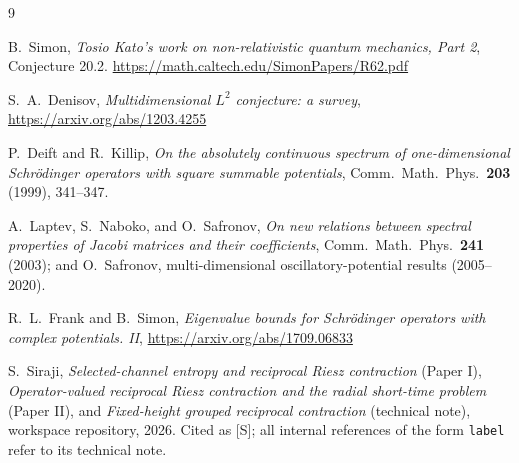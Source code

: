 \documentclass[11pt]{article}
\theoremstyle{remark}
\theoremstyle{definition}
\begin{document}
\begin{thebibliography}{9}

B.~Simon,
\emph{Tosio Kato's work on non-relativistic quantum mechanics, Part 2},
Conjecture 20.2.
\url{https://math.caltech.edu/SimonPapers/R62.pdf}

S.~A.~Denisov,
\emph{Multidimensional $L^2$ conjecture: a survey},
\url{https://arxiv.org/abs/1203.4255}

P.~Deift and R.~Killip,
\emph{On the absolutely continuous spectrum of one-dimensional Schr\"odinger
operators with square summable potentials},
Comm.~Math.~Phys.\ \textbf{203} (1999), 341--347.

A.~Laptev, S.~Naboko, and O.~Safronov,
\emph{On new relations between spectral properties of Jacobi matrices and
their coefficients},
Comm.~Math.~Phys.\ \textbf{241} (2003); and O.~Safronov, multi-dimensional
oscillatory-potential results (2005--2020).

R.~L.~Frank and B.~Simon,
\emph{Eigenvalue bounds for Schr\"odinger operators with complex potentials.
II},
\url{https://arxiv.org/abs/1709.06833}

S.~Siraji,
\emph{Selected-channel entropy and reciprocal Riesz contraction} (Paper I),
\emph{Operator-valued reciprocal Riesz contraction and the radial short-time
problem} (Paper II), and
\emph{Fixed-height grouped reciprocal contraction} (technical note),
workspace repository, 2026.  Cited as [S]; all internal references of the
form \texttt{label} refer to its technical note.

\end{thebibliography}
\end{document}
